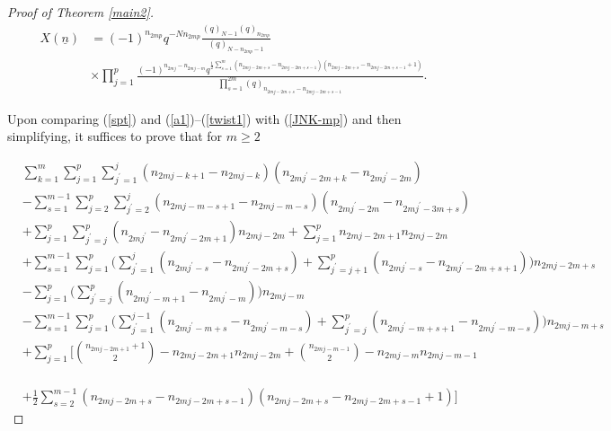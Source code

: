 \documentclass[11pt,reqno]{amsart}
\theoremstyle{definition}
\numberwithin{equation}{section}
\begin{document}
\begin{proof}[Proof of Theorem \ref{main2}]
\begin{equation} \label{twist1}
\begin{aligned}
X({\underline{n}}) & = (-1)^{n_{2mp}} q^{-Nn_{2mp}} \frac{(q)_{N-1} (q)_{n_{2mp}}}{(q)_{N - n_{2mp} - 1}} \\& \times \prod_{j=1}^{p} \frac{(-1)^{n_{2mj} - n_{2mj-m}} q^{\frac{1}{2} \sum\limits_{s=1}^{m} (n_{2mj-2m+s} - n_{2mj-2m+s-1})(n_{2mj-2m+s} - n_{2mj-2m+s-1} + 1)}}{\displaystyle \prod\limits_{s=1}^{2m} (q)_{n_{2mj-2m+s} - n_{2mj-2m+s-1}}}.
\end{aligned}
\end{equation}

\noindent Upon comparing (\ref{spt}) and (\ref{a1})--(\ref{twist1}) with (\ref{JNK-mp}) and then simplifying, it suffices to prove that for $m \geq 2$

\begin{equation*}  
\begin{aligned}
& \sum_{k=1}^{m} \sum_{j=1}^{p} \sum_{j^{\prime}=1}^{j} (n_{2mj-k+1} - n_{2mj-k})(n_{2mj^{\prime} - 2m + k} - n_{2mj^{\prime} - 2m}) \\
& - \sum_{s=1}^{m-1} \sum_{j=2}^{p} \sum_{j^{\prime}=2}^{j} (n_{2mj - m - s +1} - n_{2mj-m-s})(n_{2mj^{\prime} - 2m} - n_{2mj^{\prime} - 3m+s}) \\
& + \sum_{j=1}^{p} \sum_{j^{\prime}=j}^{p} (n_{2mj^{\prime}} - n_{2mj^{\prime} - 2m + 1})n_{2mj-2m} + \sum_{j=1}^{p}n_{2mj - 2m +1}n_{2mj-2m} \\
& + \sum_{s=1}^{m-1} \sum_{j=1}^{p} \Biggl( \sum_{j^{\prime}=1}^{j} (n_{2mj^{\prime} - s} - n_{2mj^{\prime} - 2m + s}) + \sum_{j^{\prime}=j+1}^{p} (n_{2mj^{\prime} - s} - n_{2mj^{\prime} - 2m + s + 1}) \Biggr) n_{2mj-2m+s} \\
& - \sum_{j=1}^{p} \Biggl( \sum_{j^{\prime}=j}^{p} (n_{2mj^{\prime} - m + 1} - n_{2mj^{\prime} - m}) \Biggr) n_{2mj-m} \\
& - \sum_{s=1}^{m-1} \sum_{j=1}^{p} \Biggl( \sum_{j^{\prime}=1}^{j-1} (n_{2mj^{\prime} - m + s} - n_{2mj^{\prime} - m - s}) + \sum_{j^{\prime}=j}^{p} (n_{2mj^{\prime} - m + s + 1} - n_{2mj^{\prime} - m - s} ) \Biggr) n_{2mj-m+s} \\
& + \sum_{j=1}^{p} \Biggl[ \binom{n_{2mj-2m+1} + 1}{2} - n_{2mj-2m+1} n_{2mj-2m} + \binom{n_{2mj-m-1}}{2} - n_{2mj-m} n_{2mj-m-1} \\
\end{aligned}
\end{equation*}

\begin{equation}  \label{lhs2}
\begin{aligned}
& + \frac{1}{2} \sum_{s=2}^{m-1} (n_{2mj-2m+s} - n_{2mj-2m+s-1})(n_{2mj-2m+s} - n_{2mj-2m+s-1} + 1) \Biggr]
\end{aligned}
\end{equation}


\end{proof}
\end{document}
